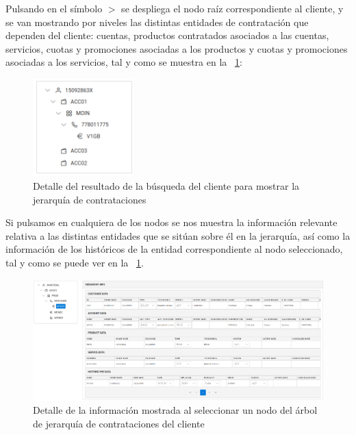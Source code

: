 Pulsando en el símbolo \large{$>$} se despliega el nodo raíz correspondiente al cliente, y se van mostrando por niveles las distintas entidades de contratación que dependen del cliente: cuentas, productos contratados asociados a las cuentas, servicios, cuotas y promociones asociadas a los productos y cuotas y promociones asociadas a los servicios,  tal y como se muestra en la \figurename~\ref{fig:vista-jerarquia-desplegada}:


\begin{figure}[H]
  \centering
  \includegraphics[width=0.35\textwidth]{imaxes/vista-jerarquia-desplegada.png}
  \caption{Detalle del resultado de la búsqueda del cliente para mostrar la jerarquía de contrataciones}
  \label{fig:vista-jerarquia-desplegada}
\end{figure}


Si pulsamos en cualquiera de los nodos se nos muestra la información relevante relativa a las distintas entidades que se sitúan sobre él en la jerarquía, así como la información de los históricos de la entidad correspondiente al nodo seleccionado, tal y como se puede ver en la \figurename~\ref{fig:vista-jerarquia-desplegada}.

\begin{figure}
  \centering
  \includegraphics[width=\textwidth]{imaxes/vista-jearquia-informacion-nodo.png}
  \caption{Detalle de la información mostrada al seleccionar un nodo del árbol de jerarquía de contrataciones del cliente}
  \label{fig:vista-jearquia-informacion-nodo}
\end{figure}